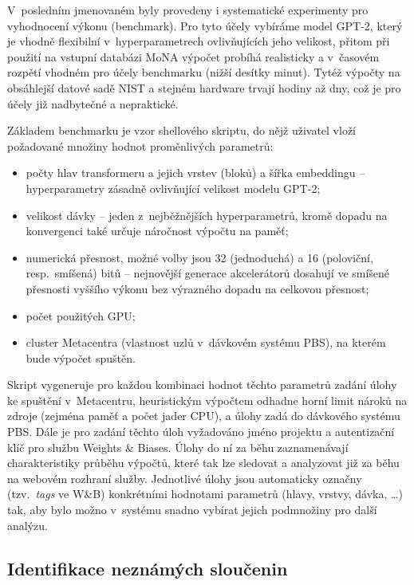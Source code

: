 \documentclass[a4paper,11pt]{article}
\begin{document}
V~posledním jmenovaném byly provedeny i systematické experimenty pro vyhodnocení výkonu (benchmark).
Pro tyto účely vybíráme model GPT-2, který je vhodně flexibilní v~hyperparametrech ovlivňujících jeho velikost,
přitom při použití na vstupní databázi MoNA výpočet probíhá realisticky a v~časovém rozpětí vhodném
pro účely benchmarku (nižší desítky minut).
Tytéž výpočty na obsáhlejší datové sadě NIST a stejném hardware trvají hodiny až dny, což je pro účely
již nadbytečné a nepraktické.

Základem benchmarku je vzor shellového skriptu, do nějž uživatel vloží požadované množiny hodnot proměnlivých parametrů: 
\begin{itemize}
\item počty hlav transformeru a jejich vrstev (bloků) a šířka embeddingu -- hyperparametry zásadně ovlivňující velikost modelu GPT-2;
\item velikost dávky -- jeden z~nejběžnějších hyperparametrů, kromě dopadu na konvergenci také určuje náročnost výpočtu na 
paměť;
\item numerická přesnost, možné volby jsou 32 (jednoduchá) a 16 (poloviční,
resp.\ smíšená) bitů -- nejnovější generace akcelerátorů dosahují ve smíšené přesnosti
vyššího výkonu bez výrazného dopadu na celkovou přesnost;
\item počet použitých GPU;
\item cluster Metacentra (vlastnost uzlů v~dávkovém systému PBS), na kterém bude výpočet spuštěn.
\end{itemize} 
Skript vygeneruje pro každou kombinaci hodnot těchto parametrů zadání úlohy ke spuštění v~Metacentru,
heuristickým výpočtem odhadne horní limit nároků na zdroje (zejména paměť a počet jader CPU), a úlohy
zadá do dávkového systému PBS.
Dále je pro zadání těchto úloh vyžadováno jméno projektu a autentizační klíč pro službu Weights \& Biases.
Úlohy do ní za běhu zaznamenávají charakteristiky průběhu výpočtů, které tak lze sledovat a analyzovat
již za běhu na webovém rozhraní služby.
Jednotlivé úlohy jsou automaticky označny (tzv.~\emph{tags} ve W\&B) konkrétními hodnotami parametrů
(hlavy, vrstvy, dávka, \dots) tak, aby bylo možno v~systému snadno vybírat jejich podmnožiny
pro další analýzu.

\subsection{Identifikace neznámých sloučenin}


\end{document}
